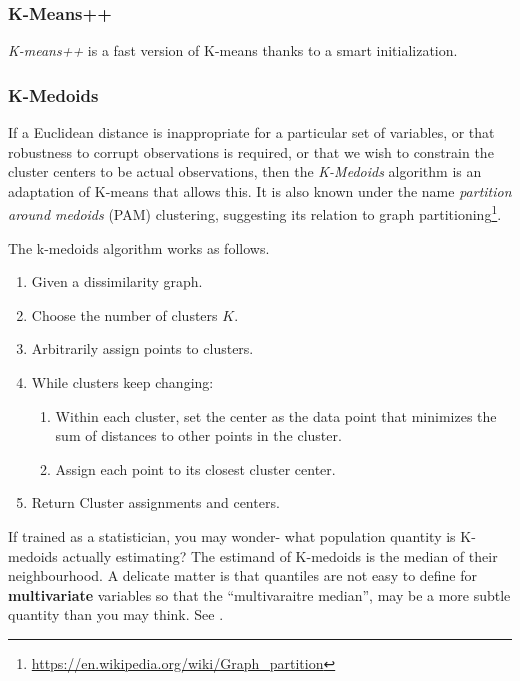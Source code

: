 \documentclass[]{book}
\providecommand{\tightlist}{%
  \setlength{\itemsep}{0pt}\setlength{\parskip}{0pt}}
\renewcommand{\href}[2]{#2\footnote{\url{#1}}}
\theoremstyle{definition}
\theoremstyle{definition}
\theoremstyle{definition}
\theoremstyle{remark}
\let\BeginKnitrBlock\begin \let\EndKnitrBlock\end
\begin{document}
\hypertarget{k-means-1}{%
\subsubsection{K-Means++}\label{k-means-1}}

\emph{K-means++} is a fast version of K-means thanks to a smart initialization.

\hypertarget{k-medoids}{%
\subsubsection{K-Medoids}\label{k-medoids}}

If a Euclidean distance is inappropriate for a particular set of variables, or that robustness to corrupt observations is required, or that we wish to constrain the cluster centers to be actual observations, then the \emph{K-Medoids} algorithm is an adaptation of K-means that allows this.
It is also known under the name \emph{partition around medoids} (PAM) clustering, suggesting its relation to \href{https://en.wikipedia.org/wiki/Graph_partition}{graph partitioning}.

The k-medoids algorithm works as follows.

\begin{enumerate}
\def\labelenumi{\arabic{enumi}.}
\tightlist
\item
  Given a dissimilarity graph.
\item
  Choose the number of clusters \(K\).
\item
  Arbitrarily assign points to clusters.
\item
  While clusters keep changing:

  \begin{enumerate}
  \def\labelenumii{\arabic{enumii}.}
  \tightlist
  \item
    Within each cluster, set the center as the data point that minimizes the sum of distances to other points in the cluster.
  \item
    Assign each point to its closest cluster center.
  \end{enumerate}
\item
  Return Cluster assignments and centers.
\end{enumerate}

\BeginKnitrBlock{remark}
{}If trained as a statistician, you may wonder- what population quantity is K-medoids actually estimating?
The estimand of K-medoids is the median of their neighbourhood.
A delicate matter is that quantiles are not easy to define for \textbf{multivariate} variables so that the ``multivaraitre median'', may be a more subtle quantity than you may think.
See \citet{small1990survey}.
\EndKnitrBlock{remark}
\end{document}

